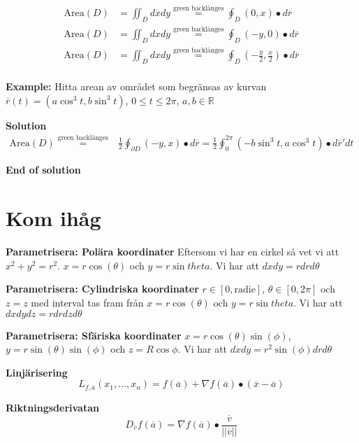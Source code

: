 \begin{align*}
    \text{Area}(D) &= \iint_{D}dxdy \stackrel{\text{green backlänges}}{=} \oint_{D} (0,x)\bullet d\overline{r} \\
    \text{Area}(D) &= \iint_{D}dxdy \stackrel{\text{green backlänges}}{=} \oint_{D} (-y,0)\bullet d\overline{r} \\
    \text{Area}(D) &= \iint_{D}dxdy \stackrel{\text{green backlänges}}{=} \oint_{D} \left(-\frac{y}{2},\frac{x}{2}\right)\bullet d\overline{r} \\
\end{align*}

\textbf{Example:}
Hitta arean av området som begränsas av kurvan $\overline{r}(t)=(a\cos^3t,b\sin^3t)$,
$0\leq t \leq 2\pi$, $a,b\in\mathbb{R}$

\textbf{Solution}
\begin{align*}
    \text{Area}(D) \stackrel{\text{green backlänges}}{=}& 
    \frac{1}{2} \oint_{\partial D} (-y,x)\bullet d\overline{r} 
    =\frac{1}{2} \oint^{2\pi}_{0} (-b\sin^3t,a\cos^3t)\bullet d\overline{r}' dt
\end{align*}

\textbf{End of solution}


\section{Kom ihåg}
\textbf{Parametrisera: Polära koordinater}
Eftersom vi har en cirkel så vet vi att $x^2+y^2=r^2$.
$x=r\cos(\theta)$ och $y=r\sin{theta}$. Vi har att $dxdy=rdrd\theta$

\textbf{Parametrisera: Cylindriska koordinater}
$r\in[0,\text{radie}]$, $\theta\in[0,2\pi]$ och $z=z$ med interval tas fram från 
$x=r\cos(\theta)$ och $y=r\sin{theta}$. Vi har att $dxdydz=rdrdzd\theta$

\textbf{Parametrisera: Sfäriska koordinater}
$x=r\cos(\theta)\sin(\phi)$, $y=r\sin(\theta)\sin(\phi)$ och $z=R\cos{\phi}$. Vi har att $dxdy=r^2\sin(\phi)drd\theta$


\textbf{Linjärisering}
\begin{equation*}
    L_{f,\overline{a}} (x_1,\ldots,x_n) = f(\overline{a}) 
    + \nabla f(\overline{a})\bullet(\overline{x}-\overline{a})
\end{equation*}


\textbf{Riktningsderivatan}
\begin{equation*}
    D_{\overline{v}}f(\overline{a})= \nabla f(\overline{a})\bullet\frac{\overline{v}}{||\overline{v}||}
\end{equation*}


